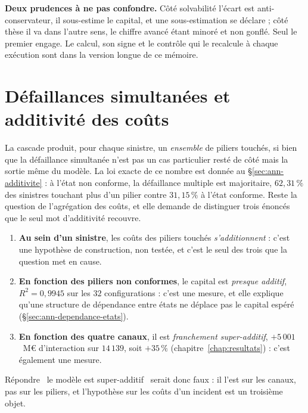 \textbf{Deux prudences à ne pas confondre.} Côté solvabilité l'écart est
anti-conservateur, il sous-estime le capital, et une sous-estimation se déclare ; côté
thèse il va dans l'autre sens, le chiffre avancé étant minoré et non gonflé. Seul le
premier engage. Le calcul, son signe et le contrôle qui le recalcule à chaque exécution
sont dans la version longue de ce mémoire.

\section{Défaillances simultanées et additivité des coûts}
\label{sec:additivite-couts}

La cascade produit, pour chaque sinistre, un \emph{ensemble} de piliers touchés, si bien que la
défaillance simultanée n'est pas un cas particulier resté de côté mais la sortie même du modèle. La
loi exacte de ce nombre est donnée au \S\ref{sec:ann-additivite} : à l'état non conforme, la
défaillance multiple est majoritaire, $62{,}31\,\%$ des sinistres touchant plus d'un
pilier contre $31{,}15\,\%$ à l'état conforme. Reste la question de l'agrégation
des coûts, et elle demande de distinguer trois énoncés que le seul mot d'additivité recouvre.

\begin{enumerate}[leftmargin=*,itemsep=2pt]
\item \textbf{Au sein d'un sinistre}, les coûts des piliers touchés \emph{s'additionnent} : c'est
une hypothèse de construction, non testée, et c'est le seul des trois que la question met en cause.
\item \textbf{En fonction des piliers non conformes}, le capital est \emph{presque additif},
$R^2=0{,}9945$ sur les $32$ configurations : c'est une mesure, et elle explique qu'une structure de
dépendance entre états ne déplace pas le capital espéré (\S\ref{sec:ann-dependance-etats}).
\item \textbf{En fonction des quatre canaux}, il est \emph{franchement super-additif},
$+5\,001$~M\euro{} d'interaction sur $14\,139$, soit $+35\,\%$ (chapitre~\ref{chap:resultats}) :
c'est également une mesure.
\end{enumerate}

\noindent Répondre \og~le modèle est super-additif~\fg{} serait donc faux : il l'est sur les canaux,
pas sur les piliers, et l'hypothèse sur les coûts d'un incident est un troisième objet.


